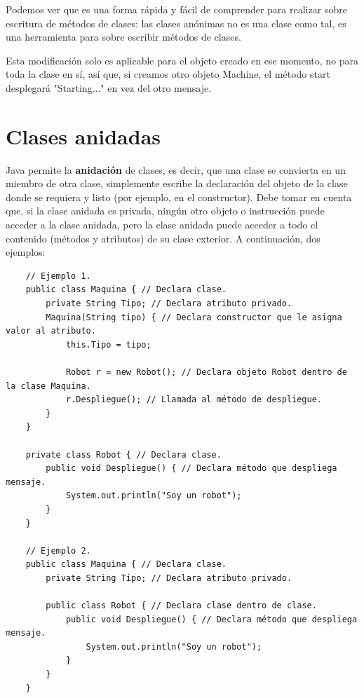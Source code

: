 Podemos ver que es una forma rápida y fácil de comprender para realizar sobre escritura de métodos de clases: las clases anónimas no es una clase como tal, es una herramienta para sobre escribir métodos de clases.

Esta modificación solo es aplicable para el objeto creado en ese momento, no para toda la clase en sí, así que, si creamos otro objeto Machine, el método start desplegará "Starting..." en vez del otro mensaje.



\section{Clases anidadas}
\hspace{0.55cm}Java permite la \textbf{anidación} de clases, es decir, que una clase se convierta en un miembro de otra clase, simplemente escribe la declaración del objeto de la clase donde se requiera y listo (por ejemplo, en el constructor). Debe tomar en cuenta que, si la clase anidada es privada, ningún otro objeto o instrucción puede acceder a la clase anidada, pero la clase anidada puede acceder a todo el contenido (métodos y atributos) de su clase exterior. A continuación, dos ejemplos:
\begin{lstlisting}
    // Ejemplo 1.
    public class Maquina { // Declara clase.
        private String Tipo; // Declara atributo privado.
        Maquina(String tipo) { // Declara constructor que le asigna valor al atributo.
            this.Tipo = tipo;
            
            Robot r = new Robot(); // Declara objeto Robot dentro de la clase Maquina.
            r.Despliegue(); // Llamada al método de despliegue.
        }
    }
    
    private class Robot { // Declara clase.
        public void Despliegue() { // Declara método que despliega mensaje.
            System.out.println("Soy un robot");
        }
    }
    
    // Ejemplo 2.
    public class Maquina { // Declara clase.
        private String Tipo; // Declara atributo privado.
        
        public class Robot { // Declara clase dentro de clase.
            public void Despliegue() { // Declara método que despliega mensaje.
                System.out.println("Soy un robot");
            }
        }
    }
\end{lstlisting}